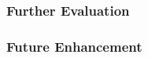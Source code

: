 
\subsubsection{Further Evaluation}
\label{sec:further-evaluation}

\subsubsection{Future Enhancement}
\label{sec:future-enhancement}

